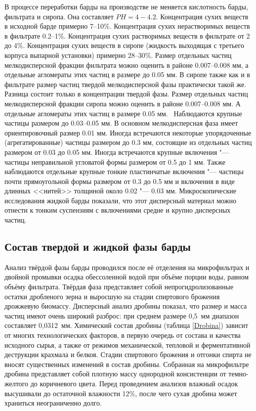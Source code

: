 В процессе переработки барды на производстве не меняется кислотность барды, фильтрата и сиропа.
Она составляет $PH = 4-4.2$.
Концентрация сухих веществ в исходной барде примерно 7--10\%.
Концентрация сухих нерастворимых веществ в фильтрате 0.2--1\%.
Концентрация сухих растворимых веществ в фильтрате от 2 до 4\%.
Концентрация сухих веществ в сиропе (жидкость выходящая с третьего корпуса выпарной установки) примерно 28--30\%.
Размер отдельных частиц мелкодисперсной фракции фильтрата можно оценить в районе 0.007--0.008 мм, а отдельные агломераты этих частиц в размере до 0.05 мм.
В сиропе также как и в фильтрате размер частиц твердой мелкодисперсной фазы практически такой же.
Разница состоит только в концентрации твердой фазы. 
\newline Размер отдельных частиц мелкодисперсной фракции сиропа можно оценить в районе 0.007--0.008 мм.
А отдельные агломераты этих частиц в размере 0.05 мм.~\cite[с.~68]{Pahomov.Analiz.2013}
Наблюдаются крупные частицы размером до 0.03--0.05 мм.
В основном мелкодисперсная фаза имеет ориентировочный размер 0.01 мм.
Иногда встречаются некоторые упорядоченные (агрегатированные) частицы размером до 0.3 мм, состоящие из отдельных частиц размером от 0.03 до 0.05 мм.
Иногда встречаются крупные включения "--- частицы неправильной угловатой формы размером от 0.5 до 1 мм.
Также наблюдаются отдельные крупные тонкие пластинчатые включения "--- частицы почти прямоугольной формы размером от 0.3 до 0.5 мм и включения в виде длинных <<нитей>> толщиной около 0.02 "--- 0.03 мм.
Микроскопические исследования жидкой барды показали, что этот дисперсный материал можно отнести к тонким суспензиям с включениями средне и крупно дисперсных частиц.~\cite[с.~67]{Pahomov.Analiz.2013}

\subsection{Состав твердой и жидкой фазы барды}

Анализ твёрдой фазы барды проводился после её отделения на микрофильтрах и двойной промывки осадка обессоленной водой при объёме порции воды, равном объёму фильтрата.
Твёрдая фаза представляет собой непрогидролизованные остатки дробленого зерна и выросшую на стадии спиртового брожения дрожжевую биомассу.
Дисперсный анализ дробины показал, что размер и масса частиц имеют очень широкий разброс: при среднем размере 0,5~мм диапазон составляет 0,0312~мм.
Химический состав дробины (таблица \ref{Drobina}) зависит от многих технологических факторов, в первую очередь от состава и качества исходного сырья, а также от режимов механической, тепловой и ферментативной деструкции крахмала и белков.
Стадии спиртового брожения и отгонки спирта не вносят существенных изменений в состав дробины.
Собранная на микрофильтре дробина представляет собой плотную массу однородной консистенции от темно-желтого до коричневого цвета.
Перед проведением анализов влажный осадок высушивали до остаточной влажности 12\%, после чего сухая дробина может храниться неограниченно долго.

